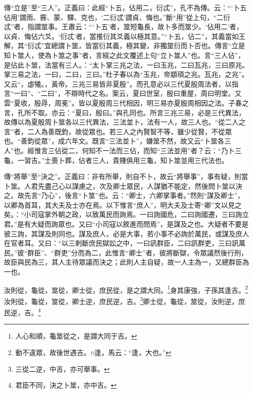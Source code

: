 {\noindent\zhuan{}\fzbyks 傳“立是”至“三人”。正義曰：此經“卜五，佔用二，衍忒”，孔不為傳。云：“‘卜五佔用’謂雨、霽、蒙、驛、克也，‘二衍忒’謂貞、悔也。”斷“用”從上句，“二衍忒”者，指謂筮事。王肅云：“‘卜五’者，筮短龜長，故卜多而筮少。‘佔用二’者，以貞、悔佔六爻。‘衍忒’者，當推衍其爻義以極其意。”“卜五，佔二”，其義當如王解，其“衍忒”宜總謂卜筮，皆當衍其義，極其變，非獨筮衍而卜否也。傳言“立是知卜筮人，使為卜筮之事”者，言經之此文覆述上句“立卜筮人”也。言“三人佔”，是佔此卜筮，法當有三人。：“太卜掌三兆之法，一曰玉兆，二曰瓦兆，三曰原兆。掌三易之法，一曰，二曰，三曰。”杜子春以為“玉兆，帝顓頊之兆。瓦兆，之兆”。又云“，虙犧。，黃帝。三兆三易皆非夏殷”。而孔意必以三代夏殷周法者，以指言“一曰”、“二曰”，不辯時代之名。案云，夏曰世室，殷曰重屋，周曰明堂。又雲“夏收，殷冔，周冕”。皆以夏殷周三代相因，明三易亦夏殷周相因之法。子春之言，孔所不取。亦云：“夏曰，殷曰。”與孔同也。所言三兆三易，必是三代異法，故傳以為夏殷周卜筮各以三代異法，三法並卜，法有一人，故三人也。“從二人之言”者，二人為善既鈞，故從眾也。若三人之內賢智不等，雖少從賢，不從眾也。“善鈞從眾”，成六年文。既言“三法並卜”，嫌筮不然，故又云“卜筮各三人”也。經惟言三佔從二，何知不一法而三佔，而知“三法並用”者？云：“乃卜三龜，一習吉。”士喪卜葬，佔者三人，貴賤俱用三龜，知卜筮並用三代法也。 \par}

{\noindent\zhuan{}\fzbyks 傳“將舉”至“決之”。正義曰：非有所舉，則自不卜，故云“將舉事”，事有疑，則當卜筮。人君先盡己心以謀慮之，次及卿士眾民，人謀猶不能定，然後問卜筮以決之。故先言“乃心”，後言“卜筮”也。云：“卿士，六卿掌事者。”然則“謀及卿士”，以卿為首耳，其大夫及士亦在焉。以下惟言“庶人”，明大夫及士寄“卿”文以見之矣。：“小司寇掌外朝之政，以致萬民而詢焉。一曰詢國危，二曰詢國遷，三曰詢立君。”是有大疑而詢眾也。又曰“小司寇以敘進而問焉”，是謀及之也。大疑者不要是彼三詢，其謀及則同也。謀及庶人，必是大事，若小事不必詢於萬民，或謀及庶人在官者耳。又曰：“以三剌斷庶民獄訟之中，一曰訊群臣，二曰訊群吏，三曰訊萬民。”彼“群臣”、“群吏”分而為二，此惟言“卿士”者，彼將斷獄，令眾議然後行刑，故臣與民為三，其人主待眾議而決之；此則人主自疑，故一人主為一，又總群臣為一也。 \par}

汝則從，龜從，筮從，卿士從，庶民從，是之謂大同。\footnote{人心和順，龜筮從之，是謂大同于吉。}身其康強，子孫其逢吉。\footnote{動不違眾，故後世遇吉。○逢，馬云：“逢，大也。”}汝則從，龜從，筮從，卿士逆，庶民逆，吉。\footnote{三從二逆，中吉，亦可舉事。}卿士從，龜從，筮從，汝則逆，庶民逆，吉。\footnote{君臣不同，決之卜筮，亦中吉。}


